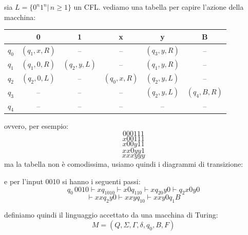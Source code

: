 \begin{example}
sia $L=\{0^n1^n|\,n\geq 1\}$ un CFL. vediamo una tabella per capire l'azione della macchina:
\begin{center}
\begin{tabular}{c|c|c|c|c|c|}
  & 0           & 1           & x           & y           & B           \\
  \hline
  $q_0$ & $(q_1,x,R)$ & --          & --          & $(q_3,y,R)$ & --          \\
  $q_1$ & $(q_1,0,R)$ & $(q_2,y,L)$ & --          & $(q_1,y,R)$ & --          \\
  $q_2$ & $(q_2,0,L)$ & --          & $(q_0,x,R)$ & $(q_2,y,L)$ & --          \\
  $q_3$ & --          & --          & --          & $(q_2,y,L)$ & $(q_4,B,R)$ \\
  $q_4$ & --          & --          & --          & --          & --
\end{tabular}
\end{center}
ovvero, per esempio:
$$000111$$
$$x00111$$
$$x00y11$$
$$xx0yy1$$
$$xxxyyy$$
\newpage
ma la tabella non è comodissima, usiamo quindi i diagrammi di transizione:
\begin{center}
\end{center}
e per l'input 0010 si hanno i seguenti passi:
$$q_0\,0010\vdash xq_1010\vdash x0q_110\vdash xq_20y0\vdash q_2x0y0$$
$$\vdash xxq_2y0\vdash xxyq_10\vdash xxy0q_1B$$
\end{example}
definiamo quindi il linguaggio accettato da una macchina di Turing:
$$M=(Q,\Sigma,\Gamma,\delta,q_0,B,F)$$

